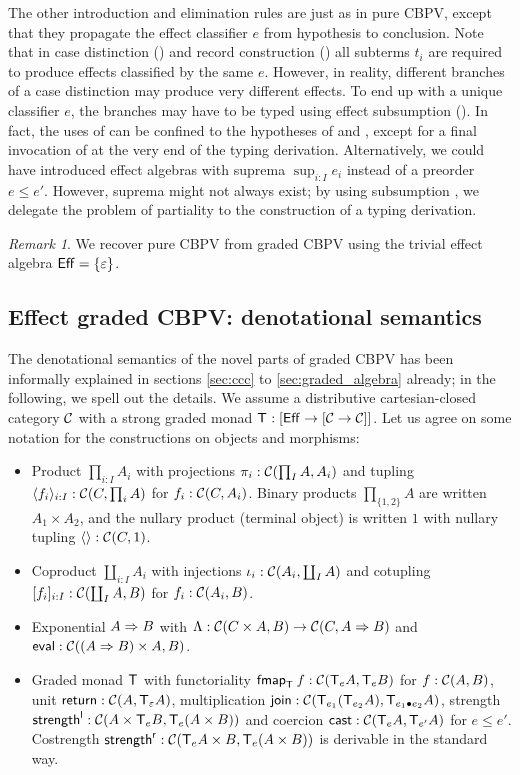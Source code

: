 \documentclass[acmsmall,review,anonymous]{acmart}\settopmatter{printfolios=true,printccs=false,printacmref=false}
\theoremstyle{remark}
\newtheorem{remark}{Remark}
\begin{document}
The other introduction and elimination rules are just as in pure
CBPV, except that they propagate the effect classifier $e$ from
hypothesis to conclusion.  Note that in case distinction (\relim\GS)
and record construction (\rintro\Pi) all subterms $t_i$ are required
to produce effects classified by the same $e$.  However, in reality,
different branches of \eg a case distinction may produce
very different effects.  To end up with a unique classifier $e$, the
branches may have to be typed using effect subsumption (\rsub).  In
fact, the uses of \rsub can be confined to the hypotheses of \relim\GS
and \rintro\Pi, except for a final invocation of \rsub at the very end
of the typing derivation.  Alternatively, we could have introduced
effect algebras with suprema $\sup_{i:I} e_i$ instead of a preorder $e
\leq e'$.  However, suprema might not always exist; by using
subsumption \rsub, we delegate the problem of partiality to the
construction of a typing derivation.

\begin{remark}\label{rem:cbpv}
  We recover pure CBPV from graded CBPV using the trivial effect
  algebra $\Eff = \{\Ge\}$.
\end{remark}

\subsection{Effect graded CBPV: denotational semantics}

The denotational semantics of the novel parts
of graded CBPV has been informally explained in
sections \ref{sec:ccc} to \ref{sec:graded_algebra} already; in the following,
we spell out the details.  We assume a distributive cartesian-closed
category $\CC$ with a strong graded monad $\T : [\Eff \to [\CC \to \CC]]$.
Let us agree on some notation for the constructions on objects and
morphisms:
\begin{itemize}
\item Product $\prod_{i:I} A_i$ with projections $\pi_i : \CC(\prod_I
  A, A_i)$ and tupling $\langle f_i
  \rangle_{i:I} : \CC(C,\prod_i A)$ for $f_i : \CC(C,A_i)$.  Binary
  products $\prod_{\{1,2\}} A$ are written $A_1 \times A_2$,
  and the nullary product (terminal object)
  is written $1$ with nullary tupling $\langle\rangle : \CC(C,1)$.
\item Coproduct $\coprod_{i:I} A_i$ with injections $\iota_i :
  \CC(A_i,\coprod_I A)$ and cotupling $[f_i]_{i:I} : \CC(\coprod_I A,
  B)$ for $f_i : \CC(A_i,B)$.
\item Exponential $A \To B$ with $\Lambda : \CC(C \times A, B) \to
  \CC(C, A \To B)$ and $\teval : \CC((A \To B) \times A, B)$.
\item Graded monad $\T$ with functoriality $\fmap[\T] f :
  \CC(\T[e]A,\T[e]B)$ for $f : \CC(A,B)$,
  unit $\treturn : \CC(A,\T[\Ge]A)$,
  multiplication $\tjoin : \CC(\T[e_1](\T[e_2]A),\T[e_1 \bu e_2]A)$,
  strength $\strengthl : \CC(A \times \T[e]B, \T[e](A \times B))$ and
  coercion $\tcast : \CC(\T[e]A,\T[e']A)$ for $e \leq e'$.
  Costrength $\strengthr : \CC(\T[e]A \times B, \T[e](A \times B))$
  is derivable in the standard way.
\end{itemize}
\end{document}
